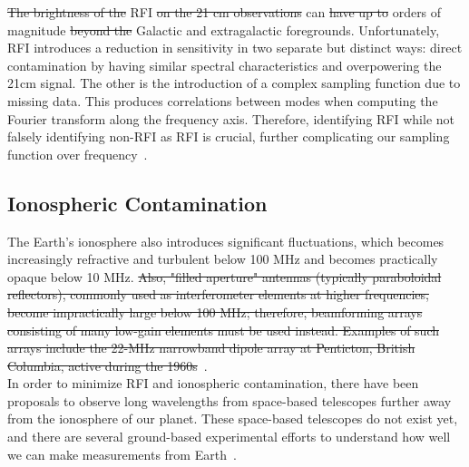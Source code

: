	    \st{The brightness of the} RFI \st{on the 21 cm observations} can \st{have up to}  orders of magnitude  \st{beyond the} Galactic and extragalactic foregrounds. Unfortunately, RFI introduces a reduction in sensitivity in two separate but distinct ways: direct contamination by having similar spectral characteristics and overpowering the 21cm signal. The other is the introduction of a complex sampling function due to missing data.  This produces correlations between modes when computing the Fourier transform along the frequency axis. Therefore,  identifying RFI while not falsely identifying non-RFI as RFI is crucial, further complicating our sampling function over frequency~\citep{2019MNRAS.488.2605K}. 
	    
	    \subsection*{Ionospheric Contamination}
	    
	    The Earth's ionosphere also introduces significant fluctuations, which becomes increasingly refractive and turbulent below 100 MHz and becomes practically opaque below 10 MHz. \st{Also, "filled aperture" antennas (typically paraboloidal reflectors), commonly used as interferometer elements at higher frequencies, become impractically large below 100 MHz; therefore, beamforming arrays consisting of many low-gain elements must be used instead. Examples of such arrays include the 22-MHz narrowband dipole array at Penticton, British Columbia, active during the 1960s}~\citep{2005ITAP...53.2480E}.   \\
	    
	    
	    In order to minimize RFI and ionospheric contamination, there have been proposals to observe long wavelengths from space-based telescopes further away from the ionosphere of our planet. These space-based telescopes do not exist yet, and there are several ground-based experimental efforts to understand how well we can make measurements from Earth~\citep{2016ExA....41..271R}.  \\
	    
